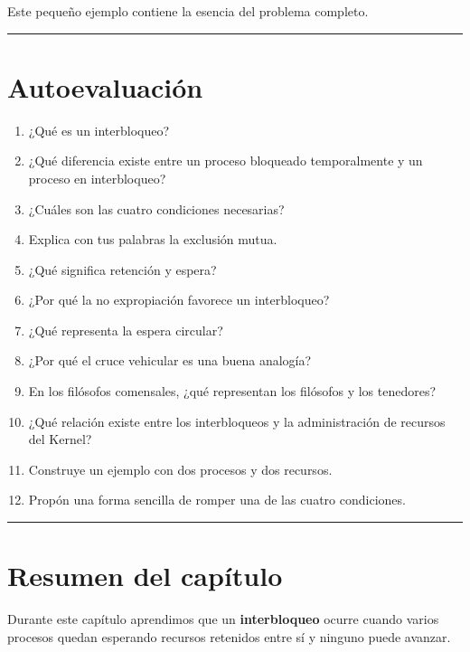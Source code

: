 \documentclass[
  spanish,
  letterpaper,
]{scrbook}
\providecommand{\tightlist}{%
  \setlength{\itemsep}{0pt}\setlength{\parskip}{0pt}}
\begin{document}
Este pequeño ejemplo contiene la esencia del problema completo.

\begin{center}\rule{0.5\linewidth}{0.5pt}\end{center}


\chapter{Autoevaluación}\label{autoevaluaciuxf3n-5}

\begin{enumerate}
\def\labelenumi{\arabic{enumi}.}
\tightlist
\item
  ¿Qué es un interbloqueo?
\item
  ¿Qué diferencia existe entre un proceso bloqueado temporalmente y un
  proceso en interbloqueo?
\item
  ¿Cuáles son las cuatro condiciones necesarias?
\item
  Explica con tus palabras la exclusión mutua.
\item
  ¿Qué significa retención y espera?
\item
  ¿Por qué la no expropiación favorece un interbloqueo?
\item
  ¿Qué representa la espera circular?
\item
  ¿Por qué el cruce vehicular es una buena analogía?
\item
  En los filósofos comensales, ¿qué representan los filósofos y los
  tenedores?
\item
  ¿Qué relación existe entre los interbloqueos y la administración de
  recursos del Kernel?
\item
  Construye un ejemplo con dos procesos y dos recursos.
\item
  Propón una forma sencilla de romper una de las cuatro condiciones.
\end{enumerate}

\begin{center}\rule{0.5\linewidth}{0.5pt}\end{center}


\chapter{Resumen del capítulo}\label{resumen-del-capuxedtulo-2}

Durante este capítulo aprendimos que un \textbf{interbloqueo} ocurre
cuando varios procesos quedan esperando recursos retenidos entre sí y
ninguno puede avanzar.
\end{document}
